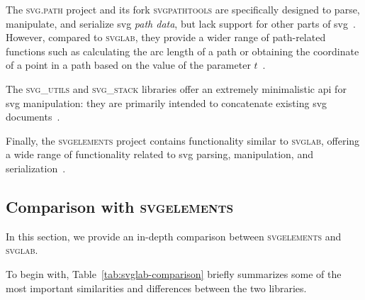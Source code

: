 The \textsc{svg.path} project and its fork \textsc{svgpathtools} are specifically designed to parse, manipulate, and serialize \gls{svg} \emph{path data}, but lack support for other parts of \gls{svg}~\cite{regebro2013svgpath, svgpathtools}. However, compared to \textsc{svglab}, they provide a wider range of path-related functions such as calculating the arc length of a path or obtaining the coordinate of a point in a path based on the value of the parameter $t$~\cite{regebro2013svgpath, svgpathtools}.

The \textsc{svg\_utils} and \textsc{svg\_stack} libraries offer an extremely minimalistic \gls{api} for \gls{svg} manipulation: they are primarily intended to concatenate existing \gls{svg} documents~\cite{telenczuk_svgutils_2021, straw2009svgstack}.

Finally, the \textsc{svgelements} project contains functionality similar to \textsc{svglab}, offering a wide range of functionality related to \gls{svg} parsing, manipulation, and serialization~\cite{svgelements}. 

\subsection{Comparison with \textsc{svgelements}}

In this section, we provide an in-depth comparison between \textsc{svgelements} and \textsc{svglab}.

To begin with, Table~\ref{tab:svglab-comparison} briefly summarizes some of the most important similarities and differences between the two libraries.

